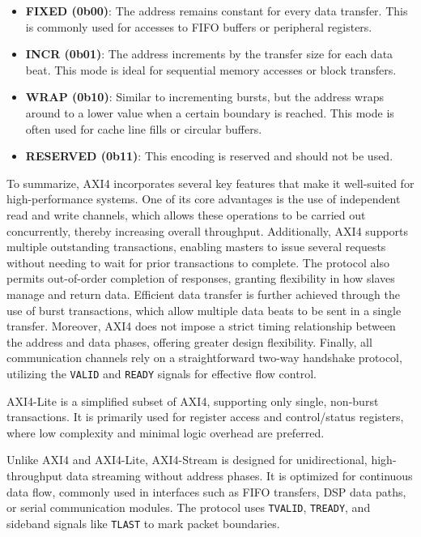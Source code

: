 \begin{itemize}
    \item \textbf{FIXED (0b00)}: The address remains constant for every data transfer. This is commonly used for accesses to FIFO buffers or peripheral registers.
    \item \textbf{INCR (0b01)}: The address increments by the transfer size for each data beat. This mode is ideal for sequential memory accesses or block transfers.
    \item \textbf{WRAP (0b10)}: Similar to incrementing bursts, but the address wraps around to a lower value when a certain boundary is reached. This mode is often used for cache line fills or circular buffers.
    \item \textbf{RESERVED (0b11)}: This encoding is reserved and should not be used.
\end{itemize}

To summarize, AXI4 incorporates several key features that make it well-suited for high-performance systems. One of its core advantages is the use of independent read and write channels, which allows these operations to be carried out concurrently, thereby increasing overall throughput. Additionally, AXI4 supports multiple outstanding transactions, enabling masters to issue several requests without needing to wait for prior transactions to complete. The protocol also permits out-of-order completion of responses, granting flexibility in how slaves manage and return data. Efficient data transfer is further achieved through the use of burst transactions, which allow multiple data beats to be sent in a single transfer. Moreover, AXI4 does not impose a strict timing relationship between the address and data phases, offering greater design flexibility. Finally, all communication channels rely on a straightforward two-way handshake protocol, utilizing the \texttt{VALID} and \texttt{READY} signals for effective flow control.

AXI4-Lite is a simplified subset of AXI4, supporting only single, non-burst transactions. It is primarily used for register access and control/status registers, where low complexity and minimal logic overhead are preferred.

Unlike AXI4 and AXI4-Lite, AXI4-Stream is designed for unidirectional, high-throughput data streaming without address phases. It is optimized for continuous data flow, commonly used in interfaces such as FIFO transfers, DSP data paths, or serial communication modules. The protocol uses \texttt{TVALID}, \texttt{TREADY}, and sideband signals like \texttt{TLAST} to mark packet boundaries.
